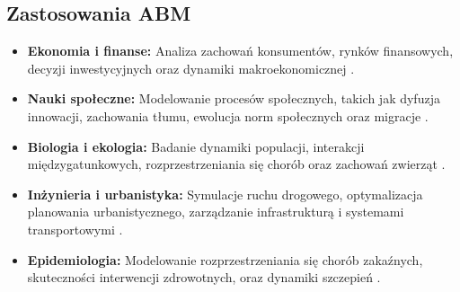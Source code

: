 \subsection{Zastosowania ABM}
\begin{itemize}
    \item \textbf{Ekonomia i finanse:} Analiza zachowań konsumentów, rynków finansowych, decyzji inwestycyjnych oraz dynamiki makroekonomicznej \cite{Tesfatsion2006}.
    \item \textbf{Nauki społeczne:} Modelowanie procesów społecznych, takich jak dyfuzja innowacji, zachowania tłumu, ewolucja norm społecznych oraz migracje \cite{Epstein2007}.
    \item \textbf{Biologia i ekologia:} Badanie dynamiki populacji, interakcji międzygatunkowych, rozprzestrzeniania się chorób oraz zachowań zwierząt \cite{Grimm2005}.
    \item \textbf{Inżynieria i urbanistyka:} Symulacje ruchu drogowego, optymalizacja planowania urbanistycznego, zarządzanie infrastrukturą i systemami transportowymi \cite{Bonabeau2002}.
    \item \textbf{Epidemiologia:} Modelowanie rozprzestrzeniania się chorób zakaźnych, skuteczności interwencji zdrowotnych, oraz dynamiki szczepień \cite{Eubank2004}.
\end{itemize}
